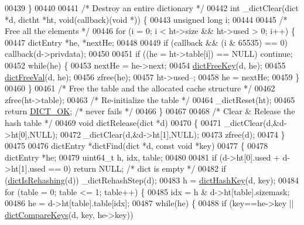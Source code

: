\begin{DoxyCode}
00439 \}
00440 
00441 \textcolor{comment}{/* Destroy an entire dictionary */}
00442 \textcolor{keywordtype}{int} \_dictClear(dict *d, dictht *ht, \textcolor{keywordtype}{void}(callback)(\textcolor{keywordtype}{void} *)) \{
00443     \textcolor{keywordtype}{unsigned} \textcolor{keywordtype}{long} i;
00444 
00445     \textcolor{comment}{/* Free all the elements */}
00446     \textcolor{keywordflow}{for} (i = 0; i < ht->size && ht->used > 0; i++) \{
00447         dictEntry *he, *nextHe;
00448 
00449         \textcolor{keywordflow}{if} (callback && (i & 65535) == 0) callback(d->privdata);
00450 
00451         \textcolor{keywordflow}{if} ((he = ht->table[i]) == NULL) \textcolor{keywordflow}{continue};
00452         \textcolor{keywordflow}{while}(he) \{
00453             nextHe = he->next;
00454             \hyperlink{dict_8h_a29fe9bb2bf0eac2c86a613536afe73ca}{dictFreeKey}(d, he);
00455             \hyperlink{dict_8h_a4a90ee4c2d8391f2d6f9c65ccf4ba037}{dictFreeVal}(d, he);
00456             zfree(he);
00457             ht->used--;
00458             he = nextHe;
00459         \}
00460     \}
00461     \textcolor{comment}{/* Free the table and the allocated cache structure */}
00462     zfree(ht->table);
00463     \textcolor{comment}{/* Re-initialize the table */}
00464     \_dictReset(ht);
00465     \textcolor{keywordflow}{return} \hyperlink{dict_8h_a2afecbeab8f7efbc183048f52f6d17e5}{DICT\_OK}; \textcolor{comment}{/* never fails */}
00466 \}
00467 
00468 \textcolor{comment}{/* Clear & Release the hash table */}
00469 \textcolor{keywordtype}{void} dictRelease(dict *d)
00470 \{
00471     \_dictClear(d,&d->ht[0],NULL);
00472     \_dictClear(d,&d->ht[1],NULL);
00473     zfree(d);
00474 \}
00475 
00476 dictEntry *dictFind(dict *d, \textcolor{keyword}{const} \textcolor{keywordtype}{void} *key)
00477 \{
00478     dictEntry *he;
00479     uint64\_t h, idx, table;
00480 
00481     \textcolor{keywordflow}{if} (d->ht[0].used + d->ht[1].used == 0) \textcolor{keywordflow}{return} NULL; \textcolor{comment}{/* dict is empty */}
00482     \textcolor{keywordflow}{if} (\hyperlink{dict_8h_aa6e4917a6a32fdf47180e03ed8969e02}{dictIsRehashing}(d)) \_dictRehashStep(d);
00483     h = \hyperlink{dict_8h_a15a270e95a4eea30557df137e9747a95}{dictHashKey}(d, key);
00484     \textcolor{keywordflow}{for} (table = 0; table <= 1; table++) \{
00485         idx = h & d->ht[table].sizemask;
00486         he = d->ht[table].table[idx];
00487         \textcolor{keywordflow}{while}(he) \{
00488             \textcolor{keywordflow}{if} (key==he->key || \hyperlink{dict_8h_ab373389c580b8441ab28082cb7643762}{dictCompareKeys}(d, key, he->key))

\end{DoxyCode}
